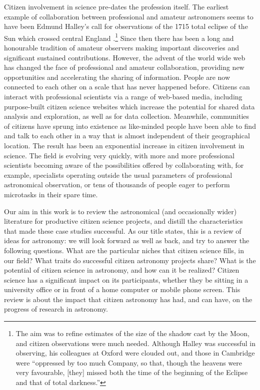 \documentclass{ar2e}
\begin{document}
Citizen involvement in science pre-dates the profession itself. The earliest
example of collaboration between professional and amateur astronomers seems to
have been Edmund Halley's call for observations of the 1715 total eclipse of the
Sun which crossed central England \citep{Halley}.\footnote{The aim was to refine
estimates of the size of the shadow cast by the Moon, and citizen observations
were much needed. Although Halley was successful in observing, his colleagues at
Oxford were clouded out, and those in Cambridge were ``oppressed by too much
Company, so that, though the heavens were very favourable, [they] missed both
the time of the beginning of the Eclipse and that of total darkness.''}  Since
then there has been a long and honourable tradition of amateur observers
making important discoveries and significant sustained contributions. However,
the advent of the world wide web has changed the face of professional and
amateur collaboration, providing new opportunities and accelerating the sharing
of information. People are now connected to each other on a scale that has never
happened before. Citizens can interact with professional scientists via a range
of web-based media, including purpose-built citizen science websites which
increase the potential for shared data analysis and exploration, as well as for
data collection. Meanwhile, communities of citizens have sprung into existence
as like-minded people have been able to find and talk to each other in a way
that is almost independent of their geographical location. The result has been
an exponential increase in citizen involvement in science. The field is evolving
very quickly, with more and more professional scientists becoming aware of the
possibilities offered by collaborating with, for example, specialists operating
outside the usual parameters of professional astronomical observation, or tens
of thousands of people eager to perform microtasks in their spare time.  

Our aim in this work is to review the astronomical (and occasionally wider)
literature for productive citizen science projects, and distill the
characteristics that made these case studies successful.  As our title states,
this is a review of ideas for astronomy: we will look forward as well as back,
and try to answer the following questions. What are the particular niches that
citizen science fills, in our field? What traits do successful citizen astronomy
projects share? What is the potential of citizen science in
astronomy, and how can it be realized?  Citizen science has a significant impact
on its participants,  whether they be sitting in a university office or in front
of a home computer or mobile phone screen. This review is about the impact that
citizen astronomy has had, and can have, on the progress of  research in
astronomy.
\end{document}
